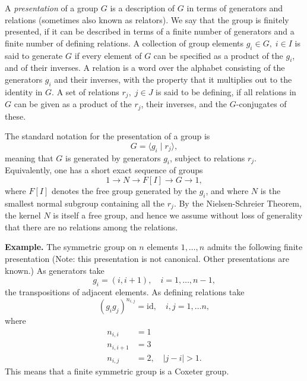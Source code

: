 \documentclass[12pt]{article}
\begin{document}
A \emph{presentation} of a group $G$ is a description of $G$ in terms of
generators and relations (sometimes also known as relators).
We say that the group is finitely
presented, if it can be described in terms of a finite number of
generators and a finite number of defining relations. A collection of
group elements $g_i\in G,\;i\in I$ is said to generate $G$ if every
element of $G$ can be specified as a product of the $g_i$, and of their
inverses.  A relation is a word over the alphabet consisting of the
generators $g_i$ and their inverses, with the property that it
multiplies out to the identity in $G$.  A set of relations $r_j,\;
j\in J$ is said to be defining, if all relations in $G$ can be given
as a product of the $r_j$, their inverses, and the $G$-conjugates of
these.

The standard notation for the presentation of a group is
$$G= \langle g_i \mid r_j \rangle,$$
meaning that $G$ is generated by generators $g_i$, subject to
relations $r_j$.  Equivalently, one has a short exact sequence of
groups 
$$1 \to N \to F[I] \to G\to 1,$$
where $F[I]$ denotes the free group
generated by the $g_i$, and where $N$ is the smallest normal subgroup
containing all the $r_j$. By the Nielsen-Schreier Theorem, the kernel $N$
is itself a free group, and hence we assume without loss of generality
that there are no relations among the relations. 

{\bf Example.}  The symmetric group on $n$ elements $1,\ldots, n$
admits the following finite presentation (Note: this presentation is
not canonical.  Other presentations are known.)  As generators take
$$g_i=(i, i+1),\quad i=1,\ldots, n-1,$$
the transpositions of adjacent elements. As defining relations take
$$(g_i g_j)^{n_{i,j}} = \mathrm{id},\quad i,j=1,\ldots n,$$
where
\begin{align*}
  n_{i,i} &= 1 \\
  n_{i,i+1} &= 3 \\
  n_{i,j} &=2,\quad \vert j-i \vert > 1.
\end{align*}
This means that a finite symmetric group is a Coxeter group.
\end{document}
